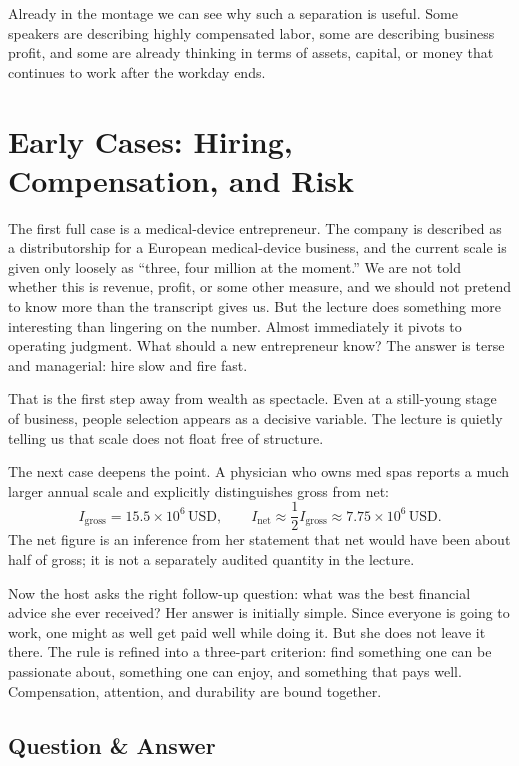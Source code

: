 Already in the montage we can see why such a separation is useful. Some speakers are describing highly compensated labor, some are describing business profit, and some are already thinking in terms of assets, capital, or money that continues to work after the workday ends.

\section{Early Cases: Hiring, Compensation, and Risk}

The first full case is a medical-device entrepreneur. The company is described as a distributorship for a European medical-device business, and the current scale is given only loosely as ``three, four million at the moment.'' We are not told whether this is revenue, profit, or some other measure, and we should not pretend to know more than the transcript gives us. But the lecture does something more interesting than lingering on the number. Almost immediately it pivots to operating judgment. What should a new entrepreneur know? The answer is terse and managerial: hire slow and fire fast.

That is the first step away from wealth as spectacle. Even at a still-young stage of business, people selection appears as a decisive variable. The lecture is quietly telling us that scale does not float free of structure.

The next case deepens the point. A physician who owns med spas reports a much larger annual scale and explicitly distinguishes gross from net:
\begin{equation}
I_{\mathrm{gross}} = 15.5 \times 10^6\,\mathrm{USD}, \qquad
I_{\mathrm{net}} \approx \frac{1}{2} I_{\mathrm{gross}} \approx 7.75 \times 10^6\,\mathrm{USD}.
\end{equation}
The net figure is an inference from her statement that net would have been about half of gross; it is not a separately audited quantity in the lecture.

Now the host asks the right follow-up question: what was the best financial advice she ever received? Her answer is initially simple. Since everyone is going to work, one might as well get paid well while doing it. But she does not leave it there. The rule is refined into a three-part criterion: find something one can be passionate about, something one can enjoy, and something that pays well. Compensation, attention, and durability are bound together.

\subsection{Question \& Answer}

